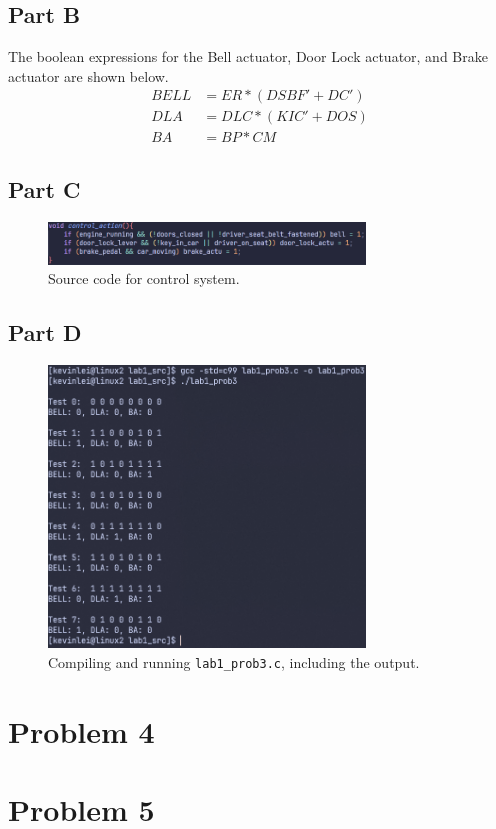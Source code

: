 \documentclass{article}
\begin{document}
\subsection{Part B}
The boolean expressions for the Bell actuator, Door Lock actuator, and Brake actuator are shown below.
\begin{align*}
    BELL &= ER * (DSBF' + DC') \\
    DLA &= DLC * (KIC' + DOS) \\
    BA &= BP * CM
\end{align*}

\subsection{Part C}
\begin{figure}[H]
    \centering
    \includegraphics[width=0.75\textwidth]{./images/prob3partc.png}
    \caption{Source code for control system.}
\end{figure}

\subsection{Part D}
\begin{figure}[H]
    \centering
    \includegraphics[width=0.75\textwidth]{./images/prob3partd.png}
    \caption{Compiling and running \lstinline!lab1_prob3.c!, including the output.}
\end{figure}

\section{Problem 4}



\section{Problem 5}
\end{document}
